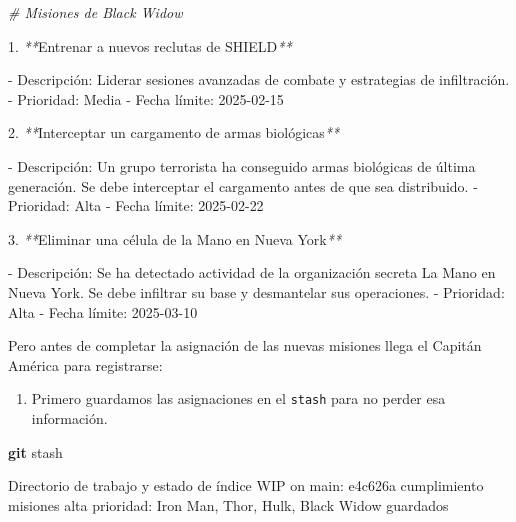 \documentclass[
]{book}
\newenvironment{Shaded}{\begin{snugshade}}{\end{snugshade}}
\newcommand{\CommentTok}[1]{\textcolor[rgb]{0.56,0.35,0.01}{\textit{#1}}}
\newcommand{\ExtensionTok}[1]{#1}
\newcommand{\FunctionTok}[1]{\textcolor[rgb]{0.13,0.29,0.53}{\textbf{#1}}}
\newcommand{\NormalTok}[1]{#1}
\newcommand{\PreprocessorTok}[1]{\textcolor[rgb]{0.56,0.35,0.01}{\textit{#1}}}
\providecommand{\tightlist}{%
  \setlength{\itemsep}{0pt}\setlength{\parskip}{0pt}}
\begin{document}
\begin{Shaded}
\begin{Highlighting}[]
\CommentTok{\# Misiones de Black Widow}

\ExtensionTok{1.} \PreprocessorTok{**}\NormalTok{Entrenar a nuevos reclutas de SHIELD}\PreprocessorTok{**}

   \ExtensionTok{{-}}\NormalTok{ Descripción: Liderar sesiones avanzadas de combate y estrategias de infiltración.}
   \ExtensionTok{{-}}\NormalTok{ Prioridad: Media}
   \ExtensionTok{{-}}\NormalTok{ Fecha límite: 2025{-}02{-}15}

\ExtensionTok{2.} \PreprocessorTok{**}\NormalTok{Interceptar un cargamento de armas biológicas}\PreprocessorTok{**}

   \ExtensionTok{{-}}\NormalTok{ Descripción: Un grupo terrorista ha conseguido armas biológicas de última generación. Se debe interceptar el cargamento antes de que sea distribuido.}
   \ExtensionTok{{-}}\NormalTok{ Prioridad: Alta}
   \ExtensionTok{{-}}\NormalTok{ Fecha límite: 2025{-}02{-}22}

\ExtensionTok{3.} \PreprocessorTok{**}\NormalTok{Eliminar una célula de la Mano en Nueva York}\PreprocessorTok{**}

   \ExtensionTok{{-}}\NormalTok{ Descripción: Se ha detectado actividad de la organización secreta La Mano en Nueva York. Se debe infiltrar su base y desmantelar sus operaciones.}
   \ExtensionTok{{-}}\NormalTok{ Prioridad: Alta}
   \ExtensionTok{{-}}\NormalTok{ Fecha límite: 2025{-}03{-}10}
\end{Highlighting}
\end{Shaded}

Pero antes de completar la asignación de las nuevas misiones llega el Capitán América para registrarse:

\begin{enumerate}
\def\labelenumi{\arabic{enumi}.}
\tightlist
\item
  Primero guardamos las asignaciones en el \texttt{stash} para no perder esa información.
\end{enumerate}

\begin{Shaded}
\begin{Highlighting}[]
\FunctionTok{git}\NormalTok{ stash}
\end{Highlighting}
\end{Shaded}

\begin{Shaded}
\begin{Highlighting}[]
\ExtensionTok{Directorio}\NormalTok{ de trabajo y estado de índice WIP on main: e4c626a cumplimiento misiones alta prioridad: Iron Man, Thor, Hulk, Black Widow guardados}
\end{Highlighting}
\end{Shaded}
\end{document}
